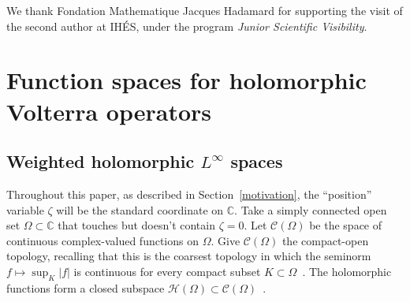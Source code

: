 \documentclass{article}
\theoremstyle{plain}
\newcommand{\C}{\mathbb{C}}
\newcommand{\cont}{\mathcal{C}}
\newcommand{\holo}{\mathcal{H}}
\begin{document}
We thank Fondation Mathematique Jacques Hadamard for supporting the visit of the second author at IH\'ES, under the program \textit{Junior Scientific Visibility}.  


\section{Function spaces for holomorphic Volterra operators}\label{fn-spaces}
\subsection{Weighted holomorphic $L^\infty$ spaces}\label{sec:fn-space-defs}
Throughout this paper, as described in Section~\ref{motivation}, the ``position'' variable $\zeta$ will be the standard coordinate on $\C$. Take a simply connected open set $\Omega \subset \C$ that touches but doesn't contain $\zeta = 0$. Let $\cont(\Omega)$ be the space of continuous complex-valued functions on $\Omega$. Give $\cont(\Omega)$ the compact-open topology, recalling that this is the coarsest topology in which the seminorm $f \mapsto \sup_K |f|$ is continuous for every compact subset $K \subset \Omega$~\cite[Example~2.6 and \S 4 notes]{fnl-cpx-anal}. The holomorphic functions form a closed subspace $\holo(\Omega) \subset \cont(\Omega)$~\cite[Proposition~3.14]{fnl-cpx-anal}.
\end{document}
